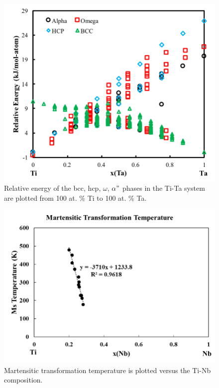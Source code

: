 \pagebreak
\begin{figure}[H]
	\centering
	\includegraphics[width=\textwidth]{Chapter-7/Figures/tita0k.png}
	\caption{Relative energy of the bcc, hcp, $\omega$, $\alpha"$ phases in the Ti-Ta system are plotted from 100 at. \% Ti to 100 at. \% Ta.}
	\label{Ch7-figure:titab0K}
\end{figure}

\pagebreak
\begin{figure}[H]
	\centering
	\includegraphics[width=\textwidth]{Chapter-7/Figures/tinbms.png}
	\caption{Martensitic transformation temperature is plotted versus the Ti-Nb composition.}
	\label{Ch7-figure:titnbms}
\end{figure}

